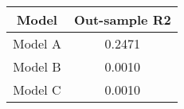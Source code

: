 \begin{tabular}{cc}
\hline
  Model  &  Out-sample R2  \\
\hline
 Model A &     0.2471      \\
 Model B &     0.0010      \\
 Model C &     0.0010      \\
\hline
\end{tabular}